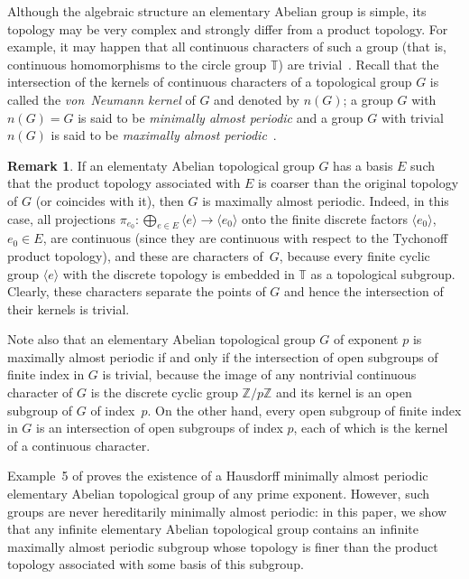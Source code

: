 \documentclass[12pt,a4paper]{amsart}
\theoremstyle{definition}
\newtheorem{remark}{Remark}
\begin{document}
Although the algebraic structure an elementary Abelian group is simple, its topology may be very complex and 
strongly differ from a product topology. For example, it may happen that all continuous characters 
of such a group (that is, continuous homomorphisms to the circle group $\mathbb T$) are 
trivial~\cite[Example~5]{ZP}. Recall that the intersection of the kernels of continuous characters of a 
topological group $G$ is called the \emph{von~Neumann kernel} of $G$ and denoted by $n(G)$; a group $G$ 
with $n(G)= G$ is said to be \emph{minimally almost periodic} and a group $G$ with trivial $n(G)$ is said to be 
\emph{maximally almost periodic}~\cite{Neumann-Wigner}. 

\begin{remark}
\label{r1}
If an elementaty Abelian topological group $G$ has a basis $E$ such that the product topology associated 
with $E$ is coarser than the original topology of $G$ (or coincides with it), then $G$ is maximally almost 
periodic. Indeed, in this case, all projections $\pi_{e_0}\colon \bigoplus_{e\in E}\langle 
e\rangle \to \langle e_0\rangle$ onto the finite discrete factors $\langle e_0\rangle$, $e_0\in E$, 
are continuous (since they are continuous with respect to the Tychonoff product topology), and these are 
characters of~$G$, because every finite cyclic group $\langle e\rangle$ with the discrete topology is embedded in $\mathbb T$ as a 
topological subgroup. Clearly, these characters separate the points of $G$ and hence the intersection of their 
kernels is trivial. 

Note also that an elementary Abelian topological group $G$ of exponent $p$ is maximally almost periodic if and only if 
the intersection of open subgroups of finite index in $G$ is trivial, because the image of any nontrivial 
continuous character of $G$ is the discrete cyclic group 
$\mathbb Z/p\mathbb Z$ and its kernel is an open subgroup of $G$ of index~$p$. On the other hand, every 
open subgroup of finite index in $G$ is an intersection of open subgroups of index $p$, each of which is the 
kernel of a continuous character. 
\end{remark}

Example~5 of \cite{ZP} proves the existence of a Hausdorff minimally almost periodic elementary 
Abelian topological group of any prime exponent. However, such groups are never hereditarily minimally almost 
periodic: in this paper, we show that any infinite elementary Abelian topological group 
contains an infinite maximally almost periodic subgroup whose topology is finer than the 
product topology associated with some basis of this subgroup.  
\end{document}
